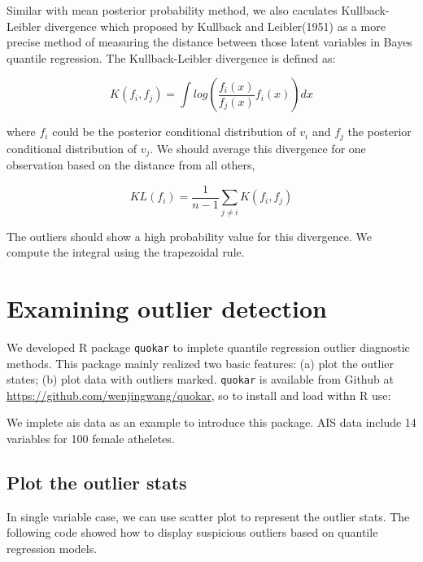 \documentclass[11pt,a4paper,]{article}
\theoremstyle{definition}
\theoremstyle{definition}
\theoremstyle{remark}
\begin{document}
Similar with mean posterior probability method, we also caculates
Kullback-Leibler divergence which proposed by Kullback and Leibler(1951)
as a more precise method of measuring the distance between those latent
variables in Bayes quantile regression. The Kullback-Leibler divergence
is defined as:

\[K(f_i, f_j)=\int log(\frac{f_i(x)}{f_j(x)}f_{i}(x))dx\]

where \(f_i\) could be the posterior conditional distribution of \(v_i\)
and \(f_j\) the posterior conditional distribution of \(v_j\). We should
average this divergence for one observation based on the distance from
all others,

\[KL(f_i)=\frac{1}{n-1}\sum_{j\neq i}K(f_i, f_j)\]

The outliers should show a high probability value for this divergence.
We compute the integral using the trapezoidal rule.

\section{Examining outlier detection}\label{examining-outlier-detection}

We developed R package \texttt{quokar} to implete quantile regression
outlier diagnostic methods. This package mainly realized two basic
features: (a) plot the outlier states; (b) plot data with outliers
marked. \texttt{quokar} is available from Github at
\url{https://github.com/wenjingwang/quokar}, so to install and load
withn R use:

We implete ais data as an example to introduce this package. AIS data
include 14 variables for 100 female atheletes.

\subsection{Plot the outlier stats}\label{plot-the-outlier-stats}

In single variable case, we can use scatter plot to represent the
outlier stats. The following code showed how to display suspicious
outliers based on quantile regression models.
\end{document}
